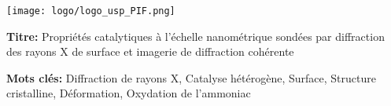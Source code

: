 \thispagestyle{empty}

\lhead{}
\rhead{}
\rfoot{}
\cfoot{}
\lfoot{}

\noindent 
\texttt{[image: logo/logo\_usp\_PIF.png]}
\vspace{0.5cm}

\small

\begin{mdframed}[linecolor=Prune,linewidth=1]

\textbf{Titre:} Propriétés catalytiques à l’échelle nanométrique sondées par diffraction des rayons X de surface et imagerie de diffraction cohérente

\noindent \textbf{Mots clés:} Diffraction de rayons X, Catalyse hétérogène, Surface, Structure cristalline, Déformation, Oxydation de l'ammoniac


\end{mdframed}
